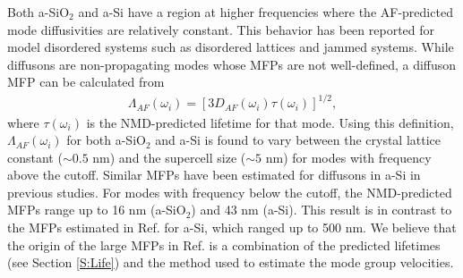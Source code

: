 \documentclass[aps,prb,twocolumn,superscriptaddress,footinbib,amsmath,amssymb,floatfix]{revtex4}
\begin{document}
Both a-SiO$_2$ and a-Si have a region at higher frequencies where 
the AF-predicted mode diffusivities are relatively constant. This 
behavior has been reported for model disordered systems such as 
disordered lattices\cite{sheng_heat_1991,beltukov_ioffe-regel_2013,
larkin_predicting_2013} and jammed systems.
\cite{xu_energy_2009,vitelli_heat_2010}  
While diffusons are non-propagating modes whose MFPs are not 
well-defined,\cite{feldman_thermal_1993} 
a diffuson MFP can be calculated from 
\begin{equation}\label{EQ:LambdaAF}
\begin{split}
\Lambda_{AF}(\omega_i) = [3D_{AF}(\omega_i)\tau(\omega_i)]^{1/2},
\end{split}
\end{equation}
where $\tau(\omega_{i})$ is the NMD-predicted lifetime for that mode. 
Using this definition, $\Lambda_{AF}(\omega_i)$ for both a-SiO$_2$ 
and a-Si is found to vary between the crystal lattice constant 
($\sim 0.5$ nm) and 
the supercell size ($\sim 5$ nm) 
for modes with frequency above the cutoff. 
Similar MFPs have been estimated for diffusons in a-Si in 
previous studies.\cite{feldman_thermal_1993,feldman_numerical_1999} 
For modes with frequency below the cutoff, the NMD-predicted 
MFPs range up to 16 nm (a-SiO$_2$) 
and 43 nm (a-Si). This result is in contrast to the MFPs 
estimated in Ref.  for a-Si, which ranged 
up to 500 nm. We believe that the origin of the large MFPs 
in Ref.  is 
a combination of the predicted lifetimes (see Section \ref{S:Life}) 
and the method used to estimate the mode group velocities.
\end{document}
